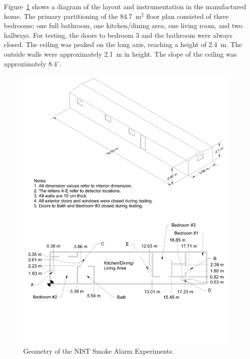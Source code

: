 Figure~\ref{NIST_Dunes_2000_Drawing} shows a diagram of the layout and instrumentation in the
manufactured home. The primary partitioning of the 84.7~m$^2$ floor plan consisted of three bedrooms:
one full bathroom, one kitchen/dining area, one living room, and two hallways. For testing, the doors
to bedroom 3 and the bathroom were always closed. The ceiling
was peaked on the long axis, reaching a height of 2.4~m. The outside walls
were approximately 2.1~m in height. The slope of the ceiling was approximately 8.4$^\circ$.

\begin{figure}
\begin{center}
\includegraphics[width=6.5in]{FIGURES/NIST_Dunes_2000/Manufactured_Home_Drawing}
\end{center}
\caption[Geometry of the NIST Dunes 2000 Experiments]{Geometry of the NIST Smoke Alarm Experiments.}
\label{NIST_Dunes_2000_Drawing}
\end{figure}

